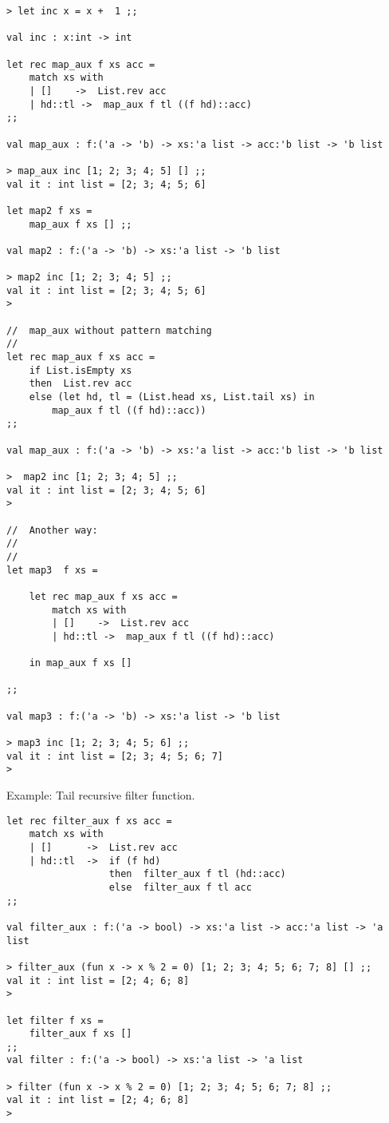 \documentclass[11pt]{article}
\begin{document}
\begin{verbatim}
> let inc x = x +  1 ;;

val inc : x:int -> int

let rec map_aux f xs acc =
    match xs with 
    | []    ->  List.rev acc 
    | hd::tl ->  map_aux f tl ((f hd)::acc)
;;

val map_aux : f:('a -> 'b) -> xs:'a list -> acc:'b list -> 'b list

> map_aux inc [1; 2; 3; 4; 5] [] ;;
val it : int list = [2; 3; 4; 5; 6]

let map2 f xs = 
    map_aux f xs [] ;;

val map2 : f:('a -> 'b) -> xs:'a list -> 'b list

> map2 inc [1; 2; 3; 4; 5] ;;
val it : int list = [2; 3; 4; 5; 6]
> 

//  map_aux without pattern matching 
// 
let rec map_aux f xs acc =
    if List.isEmpty xs 
    then  List.rev acc 
    else (let hd, tl = (List.head xs, List.tail xs) in 
        map_aux f tl ((f hd)::acc))
;;

val map_aux : f:('a -> 'b) -> xs:'a list -> acc:'b list -> 'b list

>  map2 inc [1; 2; 3; 4; 5] ;;
val it : int list = [2; 3; 4; 5; 6]
> 

//  Another way:
//  
//
let map3  f xs = 
  
    let rec map_aux f xs acc =
        match xs with 
        | []    ->  List.rev acc 
        | hd::tl ->  map_aux f tl ((f hd)::acc)
    
    in map_aux f xs [] 

;;

val map3 : f:('a -> 'b) -> xs:'a list -> 'b list

> map3 inc [1; 2; 3; 4; 5; 6] ;;
val it : int list = [2; 3; 4; 5; 6; 7]
>
\end{verbatim}

Example: Tail recursive filter function.

\begin{verbatim}
let rec filter_aux f xs acc = 
    match xs with 
    | []      ->  List.rev acc 
    | hd::tl  ->  if (f hd) 
                  then  filter_aux f tl (hd::acc)
                  else  filter_aux f tl acc
;;

val filter_aux : f:('a -> bool) -> xs:'a list -> acc:'a list -> 'a list

> filter_aux (fun x -> x % 2 = 0) [1; 2; 3; 4; 5; 6; 7; 8] [] ;;
val it : int list = [2; 4; 6; 8]
> 

let filter f xs = 
    filter_aux f xs [] 
;;
val filter : f:('a -> bool) -> xs:'a list -> 'a list

> filter (fun x -> x % 2 = 0) [1; 2; 3; 4; 5; 6; 7; 8] ;;    
val it : int list = [2; 4; 6; 8]
>
\end{verbatim}
\end{document}
